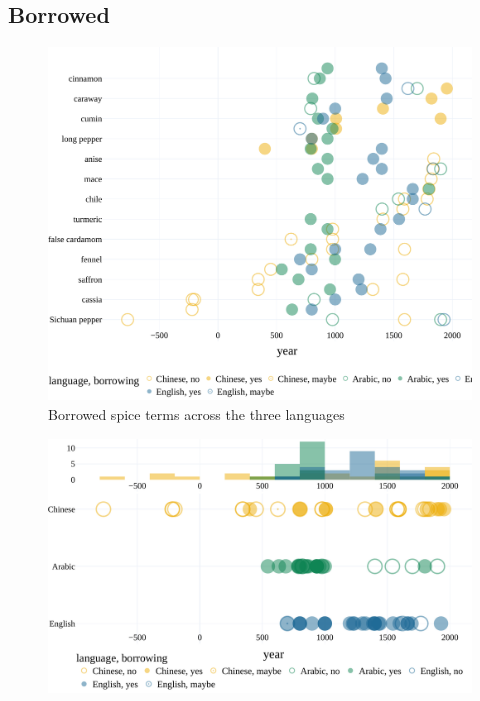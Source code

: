 \subsection{Borrowed}

\begin{figure}[!ht]
  \centering
  \includegraphics[width=\linewidth]{imgs/plots/borrowing.pdf}
  \caption{Borrowed spice terms across the three languages}
  \label{fig:borrowing}
\end{figure}

\begin{figure}[!ht]
  \centering
  \includegraphics[width=\linewidth]{imgs/plots/borrowing_compact.pdf}
  \caption{}
  \label{fig:borrowing_compact}
\end{figure}



